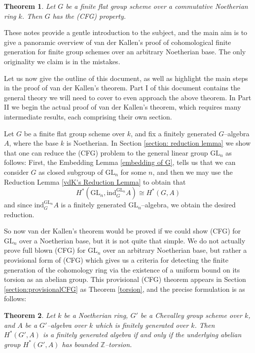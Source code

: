 \documentclass{article}
\theoremstyle{plain}
\newtheorem{thmx}{Theorem}
\theoremstyle{definition}
\newcommand{\GL}{\mathrm{GL}}
\begin{document}
\begin{thmx}\label{Thm A}
    Let $G$ be a finite flat group scheme over a commutative Noetherian ring $k$. Then $G$ has the (CFG) property.
\end{thmx}

These notes provide a gentle introduction to the subject, and the main aim is to give a panoramic overview of van der Kallen's proof of cohomological finite generation for finite group schemes over an arbitrary Noetherian base. The only originality we claim is in the mistakes.

Let us now give the outline of this document, as well as highlight the main steps in the proof of van der Kallen's theorem. Part I of this document contains the general theory we will need to cover to even approach the above theorem. In Part II  we begin the actual proof of van der Kallen's theorem, which requires many intermediate results, each comprising their own section.

Let $G$ be a finite flat group scheme over $k$, and fix a finitely generated $G$--algebra $A$, where the base $k$ is Noetherian. In Section \ref{section: reduction lemma} we show that one can reduce the (CFG) problem to the general linear group $\GL_n$ as follows: First, the  Embedding Lemma \ref{embedding of G}, tells us that we can consider $G$ as closed subgroup of $\GL_n$ for some $n$, and then we may use the Reduction Lemma \ref{vdK's Reduction Lemma} to obtain that \[H^\ast(\GL_n,\mathrm{ind}_G^{\GL_n}A)\cong H^\ast(G,A)\] and since $\mathrm{ind}_G^{\GL_n}A$ is a finitely generated $\GL_n$--algebra, we obtain the desired reduction. 

So now van der Kallen's theorem would be proved if we could show (CFG) for $\GL_n$ over a Noetherian base, but it is not quite that simple. We do not actually prove full blown (CFG) for $\GL_n$ over an arbitrary Noetherian base, but rather a provisional form of (CFG) which gives us a criteria for detecting the finite generation of the cohomology ring via the existence of a uniform bound on its torsion as an abelian group. This provisional (CFG) theorem appears in Section \ref{section:provisionalCFG} as Theorem \ref{torsion}, and the precise formulation is as follows:

\begin{thmx}\label{Thm B}
    Let $k$ be a Noetherian ring, $G'$ be a Chevalley group scheme over $k$, and $A$ be a $G'$--algebra over $k$ which is finitely generated over $k$. Then $H^\ast(G',A)$ is a finitely generated algebra if and only if the underlying abelian group $H^\ast(G',A)$ has bounded $\mathbb{Z}$--torsion.
\end{thmx}
\end{document}

